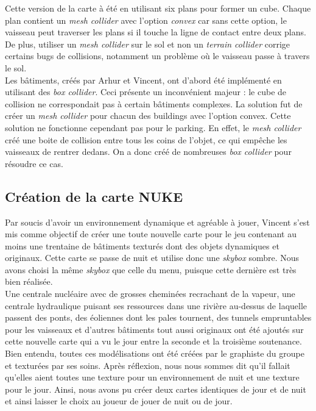 \documentclass[12pt, titlepage]{article}
\begin{document}
\begin{spacing}{1.5}
Cette version de la carte à été en utilisant six plans pour former un cube. Chaque plan contient un \textit{mesh collider} avec l’option \textit{convex} car sans cette option, le vaisseau peut traverser les plans si il touche la ligne de contact entre deux plans. De plus, utiliser un \textit{mesh collider} sur le sol et non un \textit{terrain collider} corrige certains bugs de collisions, notamment un problème où le vaisseau passe à travers le sol.\\

Les bâtiments, créés par Arhur et Vincent, ont d'abord été implémenté en utilisant des \textit{box collider}. Ceci présente un inconvénient majeur : le cube de collision ne correspondait pas à certain bâtiments complexes. La solution fut de créer un \textit{mesh collider} pour chacun des buildings avec l'option convex. Cette solution ne fonctionne cependant pas pour le parking. En effet, le \textit{mesh collider} créé une boite de collision entre tous les coins de l'objet, ce qui empêche les vaisseaux de rentrer dedans. On a donc créé de nombreuses \textit{box collider} pour résoudre ce cas.

\subsection{Création de la carte NUKE }

Par soucis d'avoir un environnement dynamique et agréable à jouer, Vincent s’est mis comme objectif de créer une toute nouvelle carte pour le jeu contenant au moins une trentaine de bâtiments texturés dont des objets dynamiques et originaux. Cette carte se passe de nuit et utilise donc une \textit{skybox} sombre. Nous avons choisi la même \textit{skybox} que celle du menu, puisque cette dernière est très bien réalisée.\\

Une centrale nucléaire avec de grosses cheminées recrachant de la vapeur, une centrale hydraulique puisant ses ressources dans une rivière au-dessus de laquelle passent des ponts, des éoliennes dont les pales tournent, des tunnels empruntables pour les vaisseaux et d’autres bâtiments tout aussi originaux ont été ajoutés sur cette nouvelle carte qui a vu le jour entre la seconde et la troisième soutenance. Bien entendu, toutes ces modélisations ont été créées par le graphiste du groupe et texturées par ses soins. Après réflexion, nous nous sommes dit qu'il fallait qu'elles aient toutes une texture pour un environnement de nuit et une texture pour le jour. Ainsi, nous avons pu créer deux cartes identiques de jour et de nuit et ainsi laisser le choix au joueur de jouer de nuit ou de jour.\\


\end{spacing}
\end{document}
